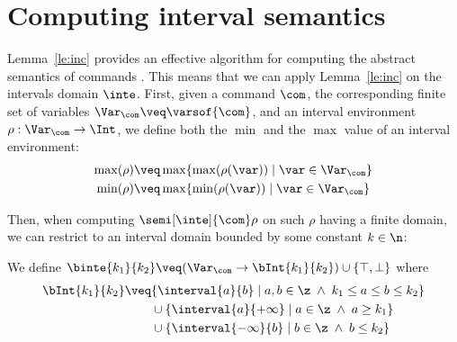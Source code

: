 \section{Computing interval semantics}\label{sec:computingint}

Lemma~\ref{le:inc} provides an effective algorithm for computing the abstract
semantics of commands%
. This means that we can apply Lemma~\ref{le:inc} on the intervals
domain \(\inte\).  First, given a command \(\com\), the corresponding
finite set of variables \(\Var_{\com} \veq \varsof{\com}\), and an
interval environment \(\rho : \Var_{\com} \to \Int\), we define both
the \(\min\) and the \(\max\) value of an interval environment:
\begin{align*}
  \max(\rho) & \veq \max \{ \max(\rho(\var)) \mid \var \in \Var_{\com}\} \\
  \min(\rho) & \veq \max \{ \min(\rho(\var)) \mid \var \in \Var_{\com}\}
\end{align*}

% 
Then, when computing \(\semi[\inte]{\com} \rho\) on such \(\rho\)
having a finite domain, we can restrict to an interval domain bounded
by some constant \(k\in\n\):

\begin{definition}\label{def:boundedint}
  We define
  \(\binte{k_1}{k_2} \veq (\Var_{\com} \to \bInt{k_1}{k_2}) \cup
  \{\top, \bot\}\) where
  \begin{align*}
    \bInt{k_1}{k_2} & \veq \{ \interval{a}{b} \mid a, b \in \z \; \land \; k_1 \leq a \leq b \leq k_2\} \\
                    & \phantom{\veq} \cup \{\interval{a}{+\infty} \mid a \in \z \; \land \; a \geq k_1\} \\
                    & \phantom{\veq} \cup \{\interval{-\infty}{b} \mid b \in \z \; \land \; b \leq k_2\}
  \end{align*}
\end{definition}

